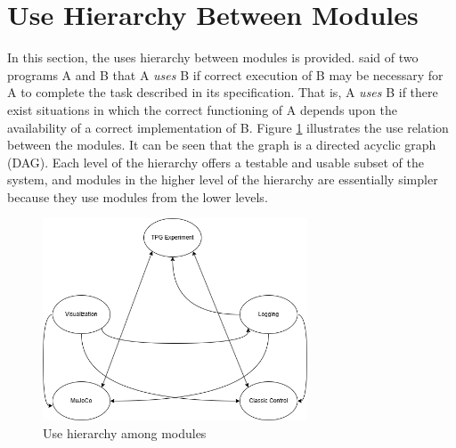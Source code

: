 \documentclass[12pt, titlepage]{article}
\begin{document}
\section{Use Hierarchy Between Modules} \label{SecUse}

In this section, the uses hierarchy between modules is
provided. \citet{Parnas1978} said of two programs A and B that A {\em uses} B if
correct execution of B may be necessary for A to complete the task described in
its specification. That is, A {\em uses} B if there exist situations in which
the correct functioning of A depends upon the availability of a correct
implementation of B.  Figure \ref{FigUH} illustrates the use relation between
the modules. It can be seen that the graph is a directed acyclic graph
(DAG). Each level of the hierarchy offers a testable and usable subset of the
system, and modules in the higher level of the hierarchy are essentially simpler
because they use modules from the lower levels.



\begin{figure}[H]
\centering
\includegraphics[width=0.7\textwidth]{use_hierarchy.png}
\caption{Use hierarchy among modules}
\label{FigUH}
\end{figure}
\end{document}
